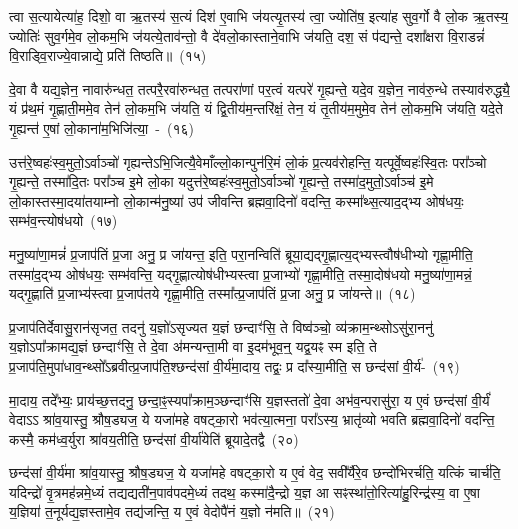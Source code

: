 त्वा स॒त्यायेत्या॑ह॒ दिशो॒ वा ऋ॒तस्य॑ स॒त्यं दिश॑ ए॒वाभि ज॑यत्यृ॒तस्य॑ त्वा॒ ज्योति॑ष॒ इत्या॑ह सुव॒र्गो वै लो॒क ऋ॒तस्य॒ ज्योतिः॑ सुव॒र्गमे॒व लो॒कम॒भि ज॑यत्ये॒ताव॑न्तो॒ वै दे॑वलो॒कास्ताने॒वाभि ज॑यति॒ दश॒ सं प॑द्यन्ते॒ दशा᳚क्षरा वि॒राडन्नं॑ वि॒राड्वि॒राज्ये॒वान्नाद्ये॒ प्रति॑ तिष्ठति॥~(१५)

{\anuvakamend[{व्यो॑मन ऋ॒तस्य॑ प्रा॒णः प॒शूने॒व विध॑र्म॒ दिव॑मे॒वाभि ज॑यत्यृ॒तस्य॒ षट्च॑त्वारिꣳशच्च}]}%

दे॒वा वै यद्य॒ज्ञेन॒ नावारु॑न्धत॒ तत्परै॒रवा॑रुन्धत॒ तत्परा॑णां पर॒त्वं यत्परे॑ गृ॒ह्यन्ते॒ यदे॒व य॒ज्ञेन॒ नाव॑रु॒न्धे तस्याव॑रुद्ध्यै॒ यं प्र॑थ॒मं गृ॒ह्णाती॒ममे॒व तेन॑ लो॒कम॒भि ज॑यति॒ यं द्वि॒तीय॑म॒न्तरि॑क्षं॒ तेन॒ यं तृ॒तीय॑म॒मुमे॒व तेन॑ लो॒कम॒भि ज॑यति॒ यदे॒ते गृ॒ह्यन्त॑ ए॒षां लो॒काना॑म॒भिजि॑त्या॒~-~(१६)

उत्त॑रे॒ष्वहः॑स्व॒मुतो॒\-ऽर्वाञ्चो॑ गृह्यन्ते\-ऽभि॒जित्यै॒वेमाँल्लो॒कान्पुन॑रि॒मं लो॒कं प्र॒त्यव॑रोहन्ति॒ यत्पूर्वे॒ष्वहः॑स्वि॒तः परा᳚ञ्चो गृ॒ह्यन्ते॒ तस्मा॑दि॒तः परा᳚ञ्च इ॒मे लो॒का यदुत्त॑रे॒ष्वहः॑स्व॒मुतो॒\-ऽर्वाञ्चो॑ गृ॒ह्यन्ते॒ तस्मा॑द॒मुतो॒\-ऽर्वाञ्च॑ इ॒मे लो॒कास्तस्मा॒द\-या॑तयाम्नो लो॒कान्म॑नु॒ष्या॑ उप॑ जीवन्ति ब्रह्मवा॒दिनो॑ वदन्ति॒ कस्मा᳚थ्स॒त्याद॒द्भ्य ओष॑धयः॒ सम्भ॑व॒न्त्योष॑धयो~(१७)

मनु॒ष्या॑णा॒मन्नं॑ प्र॒जा\-प॑तिं प्र॒जा अनु॒ प्र जा॑यन्त॒ इति॒ परा॒नन्विति॑ ब्रूया॒द्यद्गृ॒ह्णात्य॒द्भ्यस्त्वौष॑धीभ्यो गृह्णा॒मीति॒ तस्मा॑द॒द्भ्य ओष॑धयः॒ सम्भ॑वन्ति॒ यद्गृ॒ह्णात्योष॑धीभ्यस्त्वा प्र॒जाभ्यो॑ गृह्णा॒मीति॒ तस्मा॒दोष॑धयो मनु॒ष्या॑णा॒मन्नं॒ यद्गृ॒ह्णाति॑ प्र॒जाभ्य॑स्त्वा प्र॒जा\-प॑तये गृह्णा॒मीति॒ तस्मा᳚त्प्र॒जा\-प॑तिं प्र॒जा अनु॒ प्र जा॑यन्ते॥~(१८)

{\anuvakamend[{अ॒भिजि॑त्या॒ ओष॑धयो॒\-ऽष्टाच॑त्वारिꣳशच्च}]}%

प्र॒जा\-प॑तिर्देवासु॒रान॑सृजत॒ तदनु॑ य॒ज्ञो॑\-ऽसृज्यत य॒ज्ञं छन्दाꣳ॑सि॒ ते विष्व॑ञ्चो॒ व्य॑क्राम॒न्थ्सो\-ऽसु॑रा॒ननु॑ य॒ज्ञो\-ऽपा᳚क्रामद्य॒ज्ञं छन्दाꣳ॑सि॒ ते दे॒वा अ॑मन्यन्ता॒मी वा इ॒दम॑भूव॒न्॒ यद्व॒यꣴ स्म इति॒ ते प्र॒जा\-प॑ति॒मुपा॑धाव॒न्थ्सो᳚\-ऽब्रवीत्प्र॒जा\-प॑ति॒श्छन्द॑सां वी॒र्य॑मा॒दाय॒ तद्वः॒ प्र दा᳚स्या॒मीति॒ स छन्द॑सां वी॒र्य॑-~(१९)

मा॒दाय॒ तदे᳚भ्यः॒ प्राय॑च्छ॒त्तदनु॒ छन्दा॒ꣴ॒स्यपा᳚क्राम॒ञ्छन्दाꣳ॑सि य॒ज्ञस्ततो॑ दे॒वा अभ॑व॒न्परासु॑रा॒ य ए॒वं छन्द॑सां वी॒र्यं॑ वेदा\-ऽऽ\- श्रा॑व॒यास्तु॒ श्रौष॒ड्यज॒ ये यजा॑महे वषट्का॒रो भव॑त्या॒त्मना॒ परा᳚\-ऽस्य॒ भ्रातृ॑व्यो भवति ब्रह्मवा॒दिनो॑ वदन्ति॒ कस्मै॒ कम॑ध्व॒र्युरा श्रा॑वय॒तीति॒ छन्द॑सां वी॒र्या॑येति॑ ब्रूयादे॒तद्वै~(२०)

छन्द॑सां वी॒र्य॑मा श्रा॑व॒यास्तु॒ श्रौष॒ड्यज॒ ये यजा॑महे वषट्का॒रो य ए॒वं वेद॒ सवी᳚र्यैरे॒व छन्दो॑भिरर्चति॒ यत्किं चार्च॑ति॒ यदिन्द्रो॑ वृ॒त्रमह॑न्नमे॒ध्यं तद्यद्यती॑न॒पाव॑पदमे॒ध्यं तदथ॒ कस्मा॑दै॒न्द्रो य॒ज्ञ आ सꣴस्था॑तो॒रित्या॑हु॒रिन्द्र॑स्य॒ वा ए॒षा य॒ज्ञिया॑ त॒नूर्यद्य॒ज्ञस्तामे॒व तद्य॑जन्ति॒ य ए॒वं वेदोपै॑नं य॒ज्ञो न॑मति॥~(२१)

